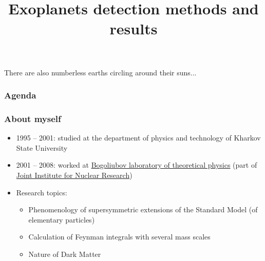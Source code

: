 \documentclass[aspectratio=169]{beamer}
\title[Exoplanets detection methods and results]{Exoplanets detection methods and results}
\author{}
\date{}
\begin{document}
{
\begin{frame}[plain]
\vspace{-5.7cm}
\small{
\centerline{There are also numberless earths circling around their suns...}
}
\end{frame}
}

\begin{frame}
\frametitle{Agenda}
\tableofcontents
\end{frame}

\begin{frame}
\frametitle{About myself}
\begin{itemize}
\item 1995 -- 2001: studied at the department of physics and technology of Kharkov State University
\item 2001 -- 2008: worked at \href{http://theor.jinr.ru}{Bogoliubov laboratory of theoretical physics}
	(part of \href{http://www.jinr.ru}{Joint Institute for Nuclear Research})
\item Research topics:
      \begin{itemize}
      \item Phenomenology of supersymmetric extensions of the Standard Model (of elementary particles)
      \item Calculation of Feynman integrals with several mass scales
      \item Nature of Dark Matter
      \end{itemize}
\end{itemize}
\end{frame}
\end{document}
